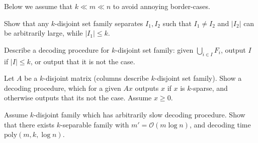 \documentclass[12pt]{uebung}
\begin{document}
 

\newcommand{\bigo}{\mathcal{O}}
\renewcommand{\aufgname}{Exercise}

Below we assume that $k \ll m \ll n$ to avoid annoying border-cases.

\begin{aufg}
Show that any $k$-disjoint set family separates $I_1,I_2$ such that $I_1 \not= I_2$ and $|I_2|$ can be arbitrarily large, while $|I_1| \le k$.
\end{aufg}

\begin{aufg}
Describe a decoding procedure for $k$-disjoint set family: given $\bigcup_{i \in I} F_i$, output $I$ if $|I| \le k$, or output that it is not the case.
\end{aufg}

\begin{aufg}
Let $A$ be a $k$-disjoint matrix (columns describe $k$-disjoint set family).  Show a decoding procedure, which for a given $Ax$ outputs $x$ if $x$ is $k$-sparse, and otherwise outputs that its not the case. Assume $x \ge 0$.
\end{aufg}

\begin{aufg}[2 pts]
Assume $k$-disjoint family which has arbitrarily slow decoding procedure. Show that there exists $k$-separable family with $m' = \bigo(m \log n)$, and decoding time $\textrm{poly}(m,k,\log n)$. 
\end{aufg}
\end{document}
